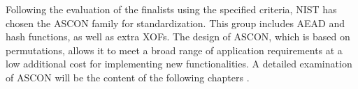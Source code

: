 \documentclass[a4paper,11pt, twoside]{article}
\begin{document}
Following the evaluation of the finalists using the specified criteria, NIST has chosen the ASCON family for standardization. This group includes AEAD and hash functions, as well as extra XOFs. The design of ASCON, which is based on permutations, allows it to meet a broad range of application requirements at a low additional cost for implementing new functionalities. A detailed examination of ASCON will be the content of the following chapters \cite{turan2021status}.



\end{document}
